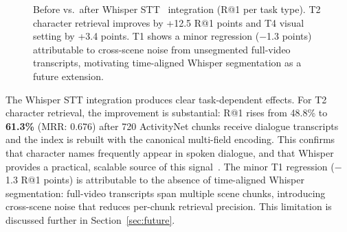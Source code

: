 \documentclass[11pt]{article}
\begin{document}
\begin{figure}[!htb]
\centering
{}
\caption{Before vs.\ after Whisper STT~\cite{whisper} integration (R@1 per
task type).  T2 character retrieval improves by +12.5 R@1 points and T4
visual setting by +3.4 points.  T1 shows a minor regression ($-$1.3 points)
attributable to cross-scene noise from unsegmented full-video transcripts,
motivating time-aligned Whisper segmentation as a future extension.}
\label{fig:whisper_impact}
\end{figure}

The Whisper STT integration produces clear task-dependent effects.  For T2
character retrieval, the improvement is substantial: R@1 rises from 48.8\%
to \textbf{61.3\%} (MRR: 0.676) after 720 ActivityNet chunks receive dialogue
transcripts and the index is rebuilt with the canonical multi-field encoding.
This confirms that character names frequently appear in spoken dialogue, and
that Whisper provides a practical, scalable source of this signal~\cite{whisper}.
The minor T1 regression ($-$1.3 R@1 points) is attributable to the absence
of time-aligned Whisper segmentation: full-video transcripts span multiple
scene chunks, introducing cross-scene noise that reduces per-chunk retrieval
precision.  This limitation is discussed further in Section~\ref{sec:future}.
\end{document}

